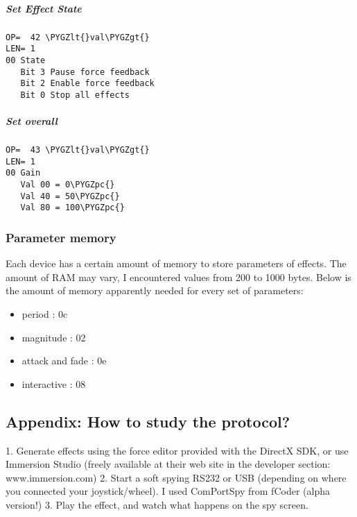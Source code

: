 \documentclass[a4paper,8pt,english]{sphinxmanual}
\def\PYGZlt{\char`\<}
\def\PYGZgt{\char`\>}
\def\PYGZpc{\char`\%}
\begin{document}
\subparagraph{Set Effect State}
\label{input/devices/iforce-protocol:set-effect-state}
\begin{Verbatim}[commandchars=\\\{\}]
OP=  42 \PYGZlt{}val\PYGZgt{}
LEN= 1
00 State
   Bit 3 Pause force feedback
   Bit 2 Enable force feedback
   Bit 0 Stop all effects
\end{Verbatim}


\subparagraph{Set overall}
\label{input/devices/iforce-protocol:set-overall}
\begin{Verbatim}[commandchars=\\\{\}]
OP=  43 \PYGZlt{}val\PYGZgt{}
LEN= 1
00 Gain
   Val 00 = 0\PYGZpc{}
   Val 40 = 50\PYGZpc{}
   Val 80 = 100\PYGZpc{}
\end{Verbatim}


\subsubsection{Parameter memory}
\label{input/devices/iforce-protocol:parameter-memory}
Each device has a certain amount of memory to store parameters of effects.
The amount of RAM may vary, I encountered values from 200 to 1000 bytes. Below
is the amount of memory apparently needed for every set of parameters:
\begin{itemize}
\item {} 
period : 0c

\item {} 
magnitude : 02

\item {} 
attack and fade : 0e

\item {} 
interactive : 08

\end{itemize}


\subsection{Appendix: How to study the protocol?}
\label{input/devices/iforce-protocol:appendix-how-to-study-the-protocol}
1. Generate effects using the force editor provided with the DirectX SDK, or
use Immersion Studio (freely available at their web site in the developer section:
www.immersion.com)
2. Start a soft spying RS232 or USB (depending on where you connected your
joystick/wheel). I used ComPortSpy from fCoder (alpha version!)
3. Play the effect, and watch what happens on the spy screen.
\end{document}
